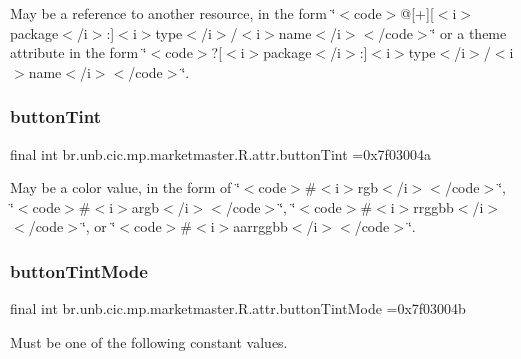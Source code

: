 May be a reference to another resource, in the form \char`\"{}$<$code$>$@\mbox{[}+\mbox{]}\mbox{[}$<$i$>$package$<$/i$>$\+:\mbox{]}$<$i$>$type$<$/i$>$/$<$i$>$name$<$/i$>$$<$/code$>$\char`\"{} or a theme attribute in the form \char`\"{}$<$code$>$?\mbox{[}$<$i$>$package$<$/i$>$\+:\mbox{]}$<$i$>$type$<$/i$>$/$<$i$>$name$<$/i$>$$<$/code$>$\char`\"{}. \mbox{\label{classbr_1_1unb_1_1cic_1_1mp_1_1marketmaster_1_1R_1_1attr_a8a9f8e3996ae46a3c224f6bca1182e5a}} 
\subsubsection{\texorpdfstring{button\+Tint}{buttonTint}}
{\footnotesize\ttfamily final int br.\+unb.\+cic.\+mp.\+marketmaster.\+R.\+attr.\+button\+Tint =0x7f03004a\hspace{0.3cm}{\ttfamily [static]}}

May be a color value, in the form of \char`\"{}$<$code$>$\#$<$i$>$rgb$<$/i$>$$<$/code$>$\char`\"{}, \char`\"{}$<$code$>$\#$<$i$>$argb$<$/i$>$$<$/code$>$\char`\"{}, \char`\"{}$<$code$>$\#$<$i$>$rrggbb$<$/i$>$$<$/code$>$\char`\"{}, or \char`\"{}$<$code$>$\#$<$i$>$aarrggbb$<$/i$>$$<$/code$>$\char`\"{}. \mbox{\label{classbr_1_1unb_1_1cic_1_1mp_1_1marketmaster_1_1R_1_1attr_ae1bf5e744d5e3d2c8e4755ef78ef4307}} 
\subsubsection{\texorpdfstring{button\+Tint\+Mode}{buttonTintMode}}
{\footnotesize\ttfamily final int br.\+unb.\+cic.\+mp.\+marketmaster.\+R.\+attr.\+button\+Tint\+Mode =0x7f03004b\hspace{0.3cm}{\ttfamily [static]}}

Must be one of the following constant values.

